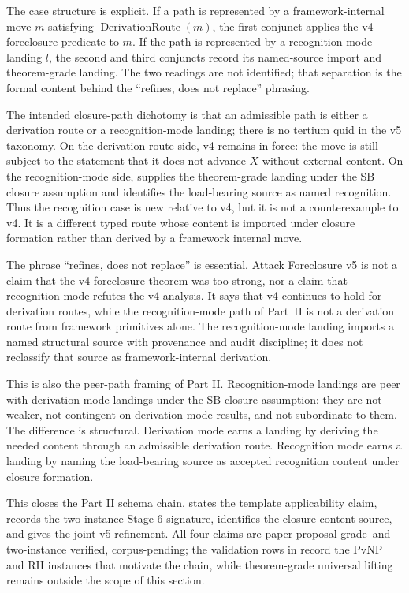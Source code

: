 \documentclass[11pt]{article}
\newcommand{\PPGrade}{paper-proposal-grade}
\newcommand{\TwoInstance}{two-instance verified, corpus-pending}
\theoremstyle{definition}
\begin{document}
The case structure is explicit.  If a path is represented by a
framework-internal move \(m\) satisfying
\(\operatorname{DerivationRoute}(m)\), the first conjunct applies the
v4 foreclosure predicate to \(m\).  If the path is represented by a
recognition-mode landing \(l\), the second and third conjuncts record
its named-source import and theorem-grade landing.  The two readings
are not identified; that separation is the formal content behind the
``refines, does not replace'' phrasing.

The intended closure-path dichotomy is that an admissible path is either
a derivation route or a recognition-mode landing; there is no tertium
quid in the v5 taxonomy.  On the derivation-route side, v4 remains in
force: the move is still subject to the statement that it does not
advance \(X\) without external content.  On the recognition-mode side,
 supplies the theorem-grade landing
under the SB closure assumption and 
identifies the load-bearing source as named recognition.  Thus
the recognition case is new relative to v4, but it is not a
counterexample to v4.  It is a different typed route whose content is
imported under closure formation rather than derived by a framework
internal move.

The phrase ``refines, does not replace'' is essential. Attack Foreclosure
v5 is not a claim that the v4 foreclosure theorem was too strong, nor a
claim that recognition mode refutes the v4 analysis. It says that v4
continues to hold for derivation routes, while the recognition-mode
path of Part~II is not a derivation route from framework primitives
alone. The
recognition-mode landing imports a named structural source with
provenance and audit discipline; it does not reclassify that source as
framework-internal derivation.

This is also the peer-path framing of Part II. Recognition-mode landings
are peer with derivation-mode landings under the SB closure assumption:
they are not weaker, not contingent on derivation-mode results, and not
subordinate to them. The difference is structural. Derivation mode earns a
landing by deriving the needed content through an admissible derivation
route. Recognition mode earns a landing by naming the load-bearing source
as accepted recognition content under closure formation.

This closes the Part II schema chain.
 states the template applicability
claim,  records the two-instance Stage-6
signature,  identifies the
closure-content source, and  gives
the joint v5 refinement. All four claims are \PPGrade\ and \TwoInstance; the
validation rows in  record the PvNP and RH
instances that motivate the chain, while theorem-grade universal
lifting remains outside the scope of this section.
\end{document}
